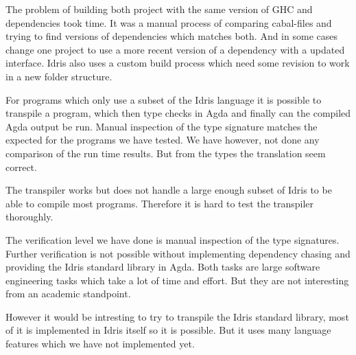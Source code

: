
The problem of building both project with the same version of GHC and
dependencies took time. It was a manual process of comparing cabal-files and
trying to find versions of dependencies which matches both. And in some cases
change one project to use a more recent version of a dependency with a updated
interface. Idris also uses a custom build process which need some revision to
work in a new folder structure.


For programs which only use a subset of the Idris
language it is possible to transpile a program, which then type checks in Agda
and finally can the compiled Agda output be run. Manual inspection of the type
signature matches the expected for the programs we have tested. We have
however, not done any comparison of the run time results. But from the types
the translation seem correct.

The transpiler works but does not handle a large enough subset of Idris to be
able to compile most programs. Therefore it is hard to test the
transpiler thoroughly.


The verification level we have done is manual inspection of the type
signatures. Further verification is not possible without implementing
dependency chasing and providing the Idris standard library in Agda. Both tasks
are large software engineering tasks which take a lot of time and effort. But
they are not interesting from an academic standpoint.

However it would be intresting to try to transpile the Idris standard library,
most of it is implemented in Idris itself so it is possible. But it uses many
language features which we have not implemented yet.

